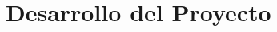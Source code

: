 \documentclass[11pt,twoside]{docs/thesis}
\begin{document}



\chapter{Desarrollo del Proyecto} 


% 







\printindex
\end{document}
